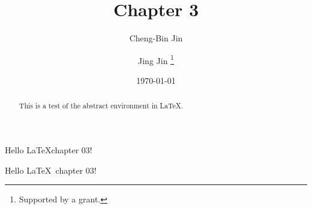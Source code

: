 \documentclass[11pt]{article}
\title{Chapter 3}
\author{Cheng-Bin Jin \and Jing Jin \thanks{Supported by a grant.}}
\date{\today}
\begin{document}
\maketitle

\begin{abstract}
This is a test of the abstract environment in \LaTeX.

\end{abstract}
\pagestyle{myheadings}

\thispagestyle{myheadings}

Hello \LaTeX chapter 03!

Hello \LaTeX \ chapter 03!
\end{document}
